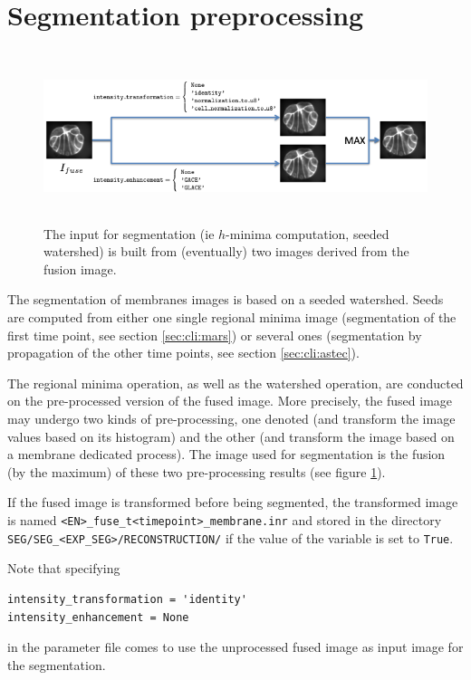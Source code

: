 \section{Segmentation preprocessing}
\label{sec:cli:input:segmentation}


\begin{figure}
\begin{center}
\includegraphics[height=50mm]{figures/build-input-segmentation.png}
\end{center}
\caption{\label{fig:cli:input:segmentation}
The input for segmentation (ie $h$-minima computation, seeded watershed) is built from (eventually) two images derived from the fusion image.}
\end{figure}


The segmentation of membranes images is based on a seeded watershed. Seeds are computed from either one single regional minima image (segmentation of the first time point, see section \ref{sec:cli:mars}) or several ones (segmentation by propagation of the other time points, see section \ref{sec:cli:astec}).


The regional minima operation, as well as the watershed operation, are conducted on the pre-processed version of the fused image. More precisely, the fused image may undergo two kinds of pre-processing, one denoted  (and transform the image values based on its histogram) and the other  (and transform the image based on a membrane dedicated process). The image used for segmentation is the fusion (by the maximum) of these two pre-processing results (see figure \ref{fig:cli:input:segmentation}).

If the fused image is transformed before being segmented, the transformed image is named \texttt{<EN>\_fuse\_t<timepoint>\_membrane.inr} and stored in the directory \texttt{SEG/SEG\_<EXP\_SEG>/RECONSTRUCTION/} if the value of the variable  is set to \texttt{True}.

Note that specifying 
\begin{verbatim}
intensity_transformation = 'identity'
intensity_enhancement = None
\end{verbatim}
in the parameter file comes to use the unprocessed fused image as input image for the segmentation.


